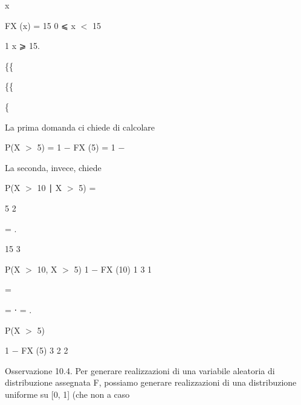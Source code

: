 \documentclass[a4paper,portrait,12pt]{article}
\begin{document}
\begin{flushleft}
x
\end{flushleft}


\begin{flushleft}
FX (x) = 15 0 ⩽ x $<$ 15
\end{flushleft}


\begin{flushleft}
1 x ⩾ 15.
\end{flushleft}





\{\{


\{\{


\{





\begin{flushleft}
La prima domanda ci chiede di calcolare
\end{flushleft}


\begin{flushleft}
P(X $>$ 5) = 1 $-$ FX (5) = 1 $-$
\end{flushleft}


\begin{flushleft}
La seconda, invece, chiede
\end{flushleft}


\begin{flushleft}
P(X $>$ 10 ∣ X $>$ 5) =
\end{flushleft}





5 2


= .


15 3





\begin{flushleft}
P(X $>$ 10, X $>$ 5) 1 $-$ FX (10) 1 3 1
\end{flushleft}


=


= ⋅ = .


\begin{flushleft}
P(X $>$ 5)
\end{flushleft}


\begin{flushleft}
1 $-$ FX (5) 3 2 2
\end{flushleft}





\begin{flushleft}
Osservazione 10.4. Per generare realizzazioni di una variabile aleatoria di distribuzione assegnata F, possiamo generare realizzazioni di una distribuzione uniforme su [0, 1] (che non a caso
\end{flushleft}
\end{document}
